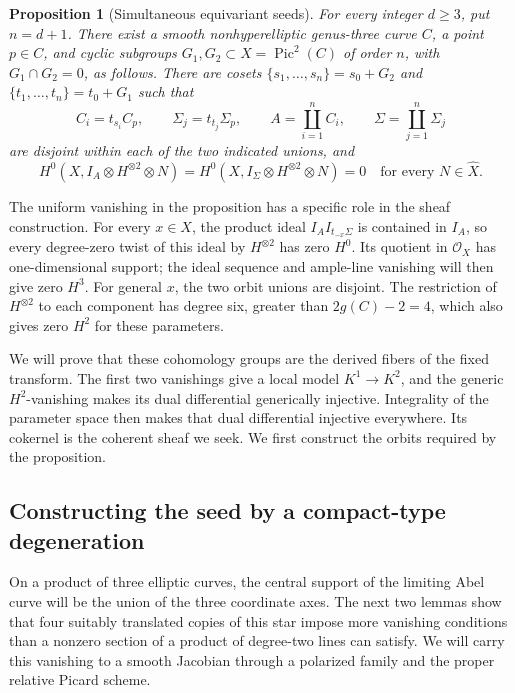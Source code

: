 \documentclass[11pt]{article}
\newtheorem{proposition}[theorem]{Proposition}
\numberwithin{equation}{section}
\begin{document}
\begin{proposition}[Simultaneous equivariant seeds]
\label{p3sw:seed}
For every integer \(d\geq3\), put \(n=d+1\).  There exist a smooth
nonhyperelliptic genus-three curve \(C\), a point \(p\in C\), and
cyclic subgroups \(G_1,G_2\subset X=\operatorname{Pic}^2(C)\) of
order \(n\), with \(G_1\cap G_2=0\), as follows.  There are cosets
\(\{s_1,\ldots,s_n\}=s_0+G_2\) and
\(\{t_1,\ldots,t_n\}=t_0+G_1\) such that
\begin{equation}
 C_i=t_{s_i}C_p,\qquad \Sigma_j=t_{t_j}\Sigma_p,\qquad
 A=\coprod_{i=1}^n C_i,\qquad \Sigma=\coprod_{j=1}^n\Sigma_j
 \label{p3sw:support-seed-orbits}
\end{equation}
are disjoint within each of the two indicated unions, and
\begin{equation}
 H^0(X,I_A\otimes H^{\otimes2}\otimes N)
 =
 H^0(X,I_\Sigma\otimes H^{\otimes2}\otimes N)=0
 \quad\text{for every }N\in\widehat X.
 \label{p3sw:support-uniform-vanishing}
\end{equation}
\end{proposition}

The uniform vanishing in the proposition has a specific role in the
sheaf construction.  For every \(x\in X\), the product ideal
\(I_A I_{t_{-x}\Sigma}\) is contained in \(I_A\), so every
degree-zero twist of this ideal by \(H^{\otimes2}\) has zero
\(H^0\).  Its quotient in \(\mathcal O_X\) has one-dimensional
support; the ideal sequence and ample-line vanishing will then give
zero \(H^3\).  For general \(x\), the two orbit unions are disjoint.
The restriction of \(H^{\otimes2}\) to each component has degree
six, greater than \(2g(C)-2=4\), which also gives zero \(H^2\)
for these parameters.

We will prove that these cohomology groups are the derived fibers of
the fixed transform.  The first two vanishings give a local model
\(K^1\to K^2\), and the generic \(H^2\)-vanishing makes its dual
differential generically injective.  Integrality of the parameter space
then makes that dual differential injective everywhere.  Its cokernel
is the coherent sheaf we seek.  We first construct the orbits required
by the proposition.

\subsection{Constructing the seed by a compact-type degeneration}

On a product of three elliptic curves, the central support of the
limiting Abel curve will be the union of the three coordinate axes.
The next two lemmas show that four
suitably translated copies of this star impose more vanishing conditions
than a nonzero section of a product of degree-two lines can satisfy.
We will carry this vanishing to a smooth Jacobian through a polarized
family and the proper relative Picard scheme.
\end{document}
